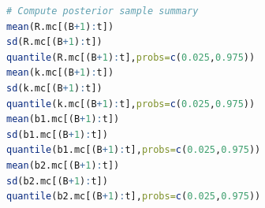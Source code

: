 \documentclass[10pt,a4paper]{article}
\begin{document}
\begin{lstlisting}[language=R]
# Compute posterior sample summary
mean(R.mc[(B+1):t])
sd(R.mc[(B+1):t])
quantile(R.mc[(B+1):t],probs=c(0.025,0.975))
mean(k.mc[(B+1):t])
sd(k.mc[(B+1):t])
quantile(k.mc[(B+1):t],probs=c(0.025,0.975))
mean(b1.mc[(B+1):t])
sd(b1.mc[(B+1):t])
quantile(b1.mc[(B+1):t],probs=c(0.025,0.975))
mean(b2.mc[(B+1):t])
sd(b2.mc[(B+1):t])
quantile(b2.mc[(B+1):t],probs=c(0.025,0.975))
\end{lstlisting} 
\end{document}
